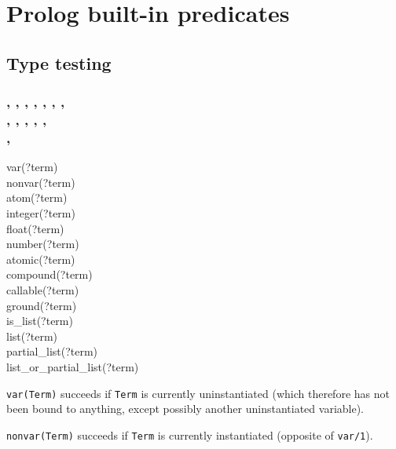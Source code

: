 \newpage
\section{Prolog built-in predicates}
\subsection{Type testing}
\subsubsection{, \label{var/1}
               ,
               ,
               ,
               ,
               ,
               , \\
               ,
               ,
               ,
               ,
               , \\
               ,
               }

\begin{TemplatesTwoCols}
var(?term)\\
nonvar(?term)\\
atom(?term)\\
integer(?term)\\
float(?term)\\
number(?term)\\
atomic(?term)\\
compound(?term)\\
callable(?term)\\
ground(?term)\\
is\_list(?term)\\
list(?term)\\
partial\_list(?term)\\
list\_or\_partial\_list(?term)

\end{TemplatesTwoCols}

\Description

\texttt{var(Term)} succeeds if \texttt{Term} is currently
uninstantiated (which therefore has not been bound to anything, except
possibly another uninstantiated variable).

\texttt{nonvar(Term)} succeeds if \texttt{Term} is currently instantiated
(opposite of \texttt{var/1}).

